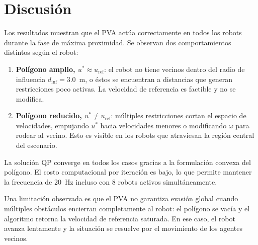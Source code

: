 \section{Discusión}

Los resultados muestran que el PVA actúa correctamente en todos los robots durante la fase de máxima proximidad. Se observan dos comportamientos distintos según el robot:

\begin{enumerate}
  \item \textbf{Polígono amplio, $u^* \approx u_{\text{ref}}$}: el robot no tiene vecinos dentro del radio de influencia $d_{\text{inf}} = 3.0$~m, o éstos se encuentran a distancias que generan restricciones poco activas. La velocidad de referencia es factible y no se modifica.

  \item \textbf{Polígono reducido, $u^* \neq u_{\text{ref}}$}: múltiples restricciones cortan el espacio de velocidades, empujando $u^*$ hacia velocidades menores o modificando $\omega$ para rodear al vecino. Esto es visible en los robots que atraviesan la región central del escenario.
\end{enumerate}

La solución QP converge en todos los casos gracias a la formulación convexa del polígono. El costo computacional por iteración es bajo, lo que permite mantener la frecuencia de 20~Hz incluso con 8 robots activos simultáneamente.

Una limitación observada es que el PVA no garantiza evasión global cuando múltiples obstáculos encierran completamente al robot: el polígono se vacía y el algoritmo retorna la velocidad de referencia saturada. En ese caso, el robot avanza lentamente y la situación se resuelve por el movimiento de los agentes vecinos.
